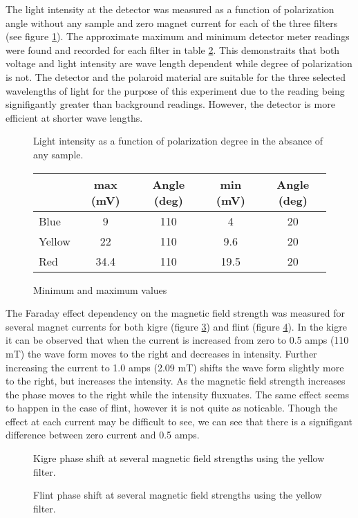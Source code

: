 \documentclass[10pt,onecolumn]{article} %
\begin{document}
The light intensity at the detector was measured as a function of polarization angle without any sample and zero magnet current for each of the three filters (see figure \ref{fig:plot02-ZeroCurrent}). The approximate maximum and minimum detector meter readings were found and recorded for each filter in table \ref{tab:MinMax}. This demonstraits that both voltage and light intensity are wave length dependent while degree of polarization is not. The detector and the polaroid material are suitable for the three selected wavelengths of light for the purpose of this experiment due to the reading being signifigantly greater than background readings. However, the detector is more efficient at shorter wave lengths\cite{Faraday}.
\begin{figure}\label{fig:plot02-ZeroCurrent}

\caption{Light intensity as a function of polarization degree in the absance of any sample.}
\end{figure}
\begin{figure}
\begin{center}
\begin{tabular}{|l|cc|cc|}
\hline
	& max (mV)	& Angle	(deg)	& min (mV)	& Angle (deg)\\
\hline
Blue	& 9		& 110		& 4		& 20\\
Yellow	& 22		& 110		& 9.6		& 20\\
Red	& 34.4		& 110		& 19.5		& 20\\
\hline
\end{tabular}
\caption{Minimum and maximum values}\label{tab:MinMax}
\end{center}
\end{figure}


The Faraday effect dependency on the magnetic field strength was measured for several magnet currents for both kigre (figure \ref{fig:plot03}) and flint (figure \ref{fig:plot04}). In the kigre it can be observed that when the current is increased from zero to 0.5 amps (110 mT) the wave form moves to the right and decreases in intensity. Further increasing the current to 1.0 amps (2.09 mT) shifts the wave form slightly more to the right, but increases the intensity. As the magnetic field strength increases the phase moves to the right while the intensity fluxuates. The same effect seems to happen in the case of flint, however it is not quite as noticable. Though the effect at each current may be difficult to see, we can see that there is a signifigant difference between zero current and 0.5 amps.
\begin{figure}

\caption{Kigre phase shift at several magnetic field strengths using the yellow filter.}\label{fig:plot03}
\end{figure}
\begin{figure}

\caption{Flint phase shift at several magnetic field strengths using the yellow filter.}\label{fig:plot04}
\end{figure}
\end{document}
